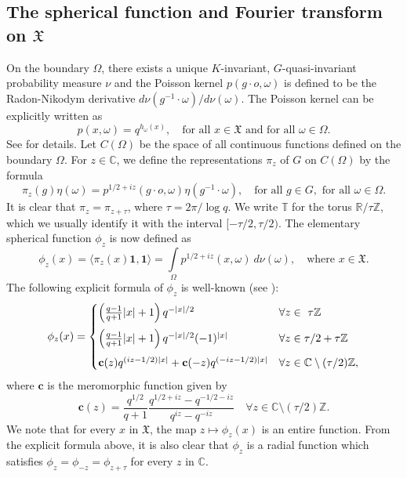 \documentclass[12pt,reqno]{amsart}
\newcommand{\C}{\mathbb C}
\newcommand{\Z}{\mathbb Z}%
\theoremstyle{definition}
\theoremstyle{definition}
\numberwithin{equation}{section}
\begin{document}
\subsection{The spherical function and Fourier transform on \texorpdfstring{$\mathfrak{X}$}{X}}
 On the boundary $\Omega$, there exists a unique $K$-invariant, $G$-quasi-invariant probability measure $\nu$ and the Poisson kernel $p(g\cdot o,\omega)$ is defined to be the Radon-Nikodym derivative $d\nu(g^{-1}\cdot\omega)/d\nu(\omega)$. The Poisson kernel can be explicitly written as
$$p(x,\omega)=q^{h_{\omega}(x)},\quad\text{for all }x\in\mathfrak{X}\text{ and for all }\omega\in\Omega.$$
See \cite[Chapter 3, Section 2]{Talamanca_Picardello_1983} for details. Let $C(\Omega)$ be the space  of all continuous functions defined on the boundary $\Omega$. For $z\in \C$, we define the representations $\pi_z$ of $G$ on $C(\Omega)$ by the formula
$$\pi_z (g)\eta(\omega )= p^{1/2+ iz} (g\cdot o , \omega) \eta(g^{-1}\cdot\omega),\quad \text{for all }g\in G,\text{ for all }\omega\in \Omega.$$
It is clear that $ \pi_z=\pi_{z+\tau}$, where $\tau=2\pi/\log q$. We write $\mathbb{T}$ for the torus $\mathbb{R}/\tau\mathbb{Z}$, which we usually identify it with the interval $[-\tau/2,\tau/2)$. The elementary spherical function $\phi_z$ is now defined as
$$\phi_{z}(x)=\langle\pi_{z}(x)\mathbf{1},\mathbf{1}\rangle=\int\limits_{\Omega}p^{1/2+iz}(x,\omega)~d\nu(\omega),\quad\text{where }x\in\mathfrak{X}.$$
The following explicit formula of $\phi_{z}$ is well-known (see \cite[Theorem 2]{Talamanca_Alessandro_1982}):
\begin{equation}\label{eqsf}
	\phi_z(x)= \begin{cases}
		\vspace*{.2cm} \left(\frac{q-1}{q+1}|x|+1\right)q^{-|x|/2}&\forall z\in\ \tau\Z\\
		\vspace*{.2cm}\left(\frac{q-1}{q+1}|x|+1\right)q^{-|x|/2}(-1)^{|x|}&\forall z\in {\tau/2}+\tau\Z\\
		\mathbf{c}(z)q^{{(iz-1/2)}|x|}+\mathbf{c}(-z)q^{{(-iz-1/2)}|x|}&\forall z\in\C\setminus(\tau/2)\Z,
	\end{cases}
\end{equation}
where $\mathbf{c}$ is the meromorphic function given by
$$\mathbf{c}(z)=\frac{q^{1/2}}{q+1}\frac{q^{1/2+iz}-q^{-{1/2}-iz}}{q^{iz}-q^{-iz}}\quad\forall z\in \C \setminus (\tau/2)\Z.$$
We note that for every $x$ in $\mathfrak{X}$, the map $z\mapsto\phi_{z}(x)$ is an entire function. From the explicit formula above, it is also clear that $\phi_{z}$ is a radial function which satisfies $\phi_{z}=\phi_{-z}=\phi_{z+\tau}$ for every $z$ in $\mathbb{C}$.
\end{document}
